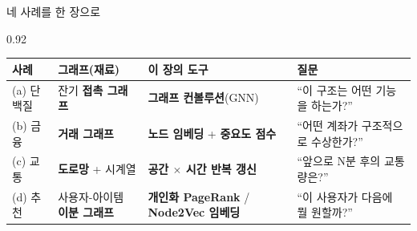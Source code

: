 \begin{frame}{네 사례를 한 장으로}
\begin{center}\begin{varwidth}{0.92\textwidth}
  \small
  \begin{tabular}{@{}p{}p{}p{}p{}@{}}
    \toprule
    사례 & 그래프(재료) & 이 장의 도구 & 질문 \\
    \midrule
    (a) 단백질 & 잔기 \textbf{접촉 그래프}
      & \textbf{그래프 컨볼루션}(GNN) & ``이 구조는 어떤 기능을
      하는가?'' \\
    (b) 금융 & \textbf{거래 그래프}
      & \textbf{노드 임베딩} + \textbf{중요도 점수} & ``어떤 계좌가
      구조적으로 수상한가?'' \\
    (c) 교통 & \textbf{도로망} + 시계열
      & \textbf{공간 $\times$ 시간 반복 갱신} & ``앞으로 N분 후의
      교통량은?'' \\
    (d) 추천 & 사용자-아이템 \textbf{이분 그래프}
      & \textbf{개인화 PageRank} / \textbf{Node2Vec 임베딩} &
      ``이 사용자가 다음에 뭘 원할까?'' \\
    \bottomrule
  \end{tabular}
\end{varwidth}\end{center}
\end{frame}
